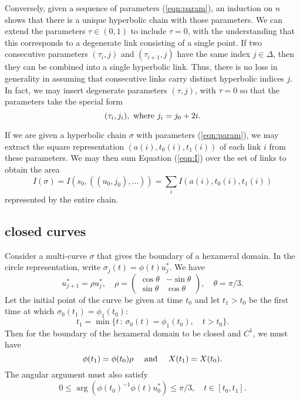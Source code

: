 \documentclass[11pt]{amsart}
\def\ta{{\tau}}
\def\mid{\,:\,}
\begin{document}
Conversely, given a sequence of parameters (\ref{eqn:param}),
an  induction on $n$ shows that there is a unique hyperbolic chain
with those parameters.  
We can extend the parameters $\ta\in (0,1)$ to include $\ta=0$,
with the understanding that this corresponds to a degenerate link consisting of a single point.  If two consecutive parameters $(\ta_i,j)$ and 
$(\ta_{i+1},j)$ have the same index $j\in\Delta$, then they can be
combined into a single hyperbolic link.  Thus, there is no loss in
generality in assuming that consecutive 
links carry distinct hyperbolic indices $j$.  In fact,
we may insert degenerate parameters $(\ta,j)$, with $\ta=0$ so that
the parameters take the special form
\begin{equation}\label{eqn:ji}
  (\ta_i,j_i),\hbox{ where } j_i = j_0 + 2 i.
\end{equation}

If we are given a hyperbolic chain $\sigma$ 
with parameters (\ref{eqn:param}),
we may extract the square representation $(a(i),t_0(i),t_1(i))$
of each
link $i$ from these parameters.  We may then sum Equation (\ref{eqn:I})
over the set of links to obtain the area
\begin{equation}\label{eqn:Isigma}
I(\sigma) = I(s_0,((u_0,j_0),\ldots)) = \sum_i I(a(i),t_0(i),t_1(i))
\end{equation}
represented by the entire chain.

\subsection{closed curves}

Consider a multi-curve $\sigma$ that gives the boundary of a hexameral domain.  In the circle
representation, 
write $\sigma_j(t) = \phi(t)u^*_j$.  We have
$$u^*_{j+1} = \rho u^*_j,\quad \rho=\left(\begin{array}{ccc} \cos\theta & -\sin\theta\\ \sin\theta & \cos\theta\end{array}\right),\quad \theta=\pi/3.$$
Let the initial point of the curve be given at time $t_0$ and let $t_1>t_0$ be the first time
at which $\sigma_0(t_1) = \phi_1(t_0)$:
\begin{equation}\label{eqn:t0}
t_1 = \min \{ t \mid \sigma_0(t) = \phi_1(t_0), \quad t>t_0\}.
\end{equation} 
Then for the boundary of the hexameral domain to be closed
and $C^1$, we must have
\begin{equation}\label{eqn:closed}
\phi(t_1) = \phi(t_0)\rho\quad\hbox{ and }\quad X(t_1) = X(t_0).
\end{equation}
The angular argument must also satisfy
\begin{equation}\label{eqn:arg}
0\le \arg (\phi(t_0)^{-1}\phi(t)u^*_0) \le \pi/3,\quad t\in[t_0,t_1].
\end{equation}
\end{document}
